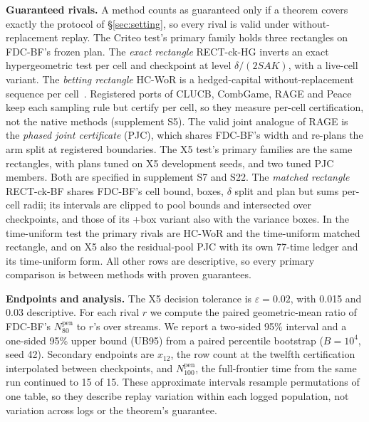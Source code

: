 \documentclass[sigconf,anonymous,review]{acmart}
\newcommand{\eps}{\varepsilon}
\newcommand{\Npen}{N_{80}^{\text{pen}}}
\begin{document}
\textbf{Guaranteed rivals.} A method counts as guaranteed only if a theorem covers exactly the protocol of \S\ref{sec:setting}, so every rival is valid under without-replacement replay. The Criteo test's primary family holds three rectangles on FDC-BF's frozen plan. The \emph{exact rectangle} RECT-ck-HG inverts an exact hypergeometric test per cell and checkpoint at level $\delta/(2SAK)$, with a live-cell variant. The \emph{betting rectangle} HC-WoR is a hedged-capital without-replacement sequence per cell~\citep{waudbysmith2020confidence,waudbysmith2024estimating}. Registered ports of CLUCB, CombGame, RAGE and Peace keep each sampling rule but certify per cell, so they measure per-cell certification, not the native methods (supplement S5). The valid joint analogue of RAGE is the \emph{phased joint certificate} (PJC), which shares FDC-BF's width and re-plans the arm split at registered boundaries. The X5 test's primary families are the same rectangles, with plans tuned on X5 development seeds, and two tuned PJC members. Both are specified in supplement S7 and S22. The \emph{matched rectangle} RECT-ck-BF shares FDC-BF's cell bound, boxes, $\delta$ split and plan but sums per-cell radii; its intervals are clipped to pool bounds and intersected over checkpoints, and those of its +box variant also with the variance boxes. In the time-uniform test the primary rivals are HC-WoR and the time-uniform matched rectangle, and on X5 also the residual-pool PJC with its own 77-time ledger and its time-uniform form. All other rows are descriptive, so every primary comparison is between methods with proven guarantees.

\textbf{Endpoints and analysis.} The X5 decision tolerance is $\eps = 0.02$, with 0.015 and 0.03 descriptive. For each rival $r$ we compute the paired geometric-mean ratio of FDC-BF's $\Npen$ to $r$'s over streams. We report a two-sided 95\% interval and a one-sided 95\% upper bound (UB95) from a paired percentile bootstrap ($B = 10^4$, seed 42). Secondary endpoints are $x_{12}$, the row count at the twelfth certification interpolated between checkpoints, and $N_{100}^{\text{pen}}$, the full-frontier time from the same run continued to 15 of 15. These approximate intervals resample permutations of one table, so they describe replay variation within each logged population, not variation across logs or the theorem's guarantee.
\end{document}
